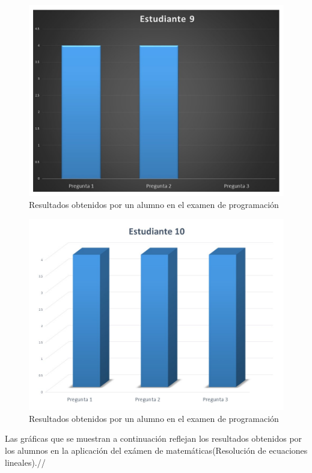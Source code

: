 \documentclass[12pt] {report}
\begin{document}
\begin{figure}[H]
\centering 
\includegraphics[scale=.7]{PEstudiante9.JPG}
\caption{Resultados obtenidos por un alumno en el examen de programación}
\end{figure}

\begin{figure}[H]
\centering 
\includegraphics[scale=.7]{PEstudiante10.JPG}
\caption{Resultados obtenidos por un alumno en el examen de programación}
\end{figure}

Las gráficas que se muestran a continuación reflejan los resultados obtenidos por los alumnos en la aplicación del exámen de matemáticas(Resolución de ecuaciones lineales).//
\end{document}
